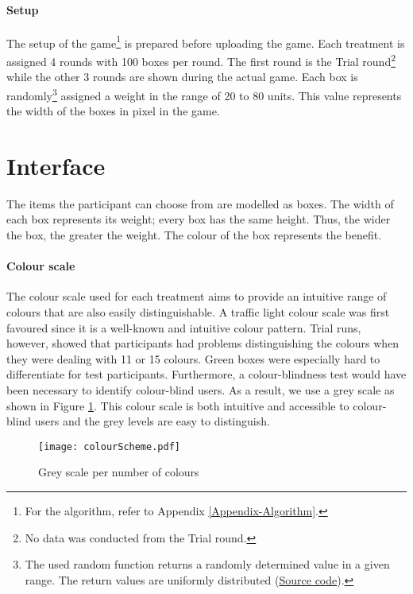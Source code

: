 \paragraph{Setup}
\label{ch:Experiment:sec:Setup}

The setup of the game\footnote{For the algorithm, refer to Appendix \ref{Appendix-Algorithm}.} is prepared before uploading the game. 
Each treatment is assigned 4 rounds with 100 boxes per round. The first round is the Trial round\footnote{No data was conducted from the Trial round.} while the other 3 rounds are shown during the actual game.
Each box is randomly\footnote{The used random function returns a randomly determined value in a given range. The return values are uniformly distributed (\href{http://hg.python.org/cpython/file/2.7/Lib/random.py}{Source code}).} assigned a weight in the range of 20 to 80 units. This value represents the width of the boxes in pixel in the game.



\section{Interface}
\label{ch:Experiment:sec:Interface}
The items the participant can choose from are modelled as boxes. The width of each box represents its weight; every box has the same height. Thus, the wider the box, the greater the weight. 
The colour of the box represents the benefit.

\paragraph{Colour scale}
The colour scale used for each treatment aims to provide an intuitive range of colours that are also easily distinguishable. A traffic light colour scale was first favoured  since it is a well-known and intuitive colour pattern. Trial runs, however, showed that participants had problems distinguishing the colours when they were dealing with 11 or 15 colours. Green boxes were especially hard to differentiate for test participants. Furthermore, a colour-blindness test would have been necessary to identify colour-blind users.
As a result, we use a grey scale as shown in Figure \ref{fig:colourScheme}. This colour scale is both intuitive and accessible to colour-blind users and the grey levels are easy to distinguish.\\
\begin{figure}[htp] %
\begin{center}
  \texttt{[image: colourScheme.pdf]}
\caption{Grey scale per number of colours}
\label{fig:colourScheme}
\end{center}
\end{figure} 

